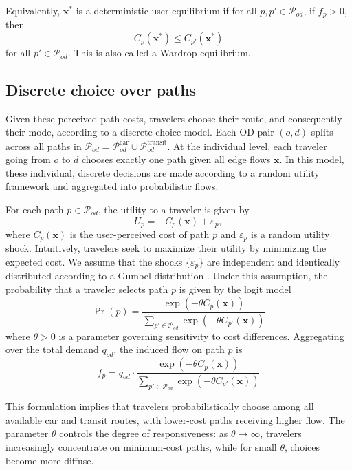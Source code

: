 \documentclass[12pt]{article}
\newcommand{\Pset}{\mathcal{P}}
\newcommand{\POD}{\Pset_{od}}
\newcommand{\PcarOD}{\Pset_{od}^\text{car}}
\newcommand{\PtransitOD}{\Pset_{od}^\text{transit}}
\renewcommand{\vec}[1]{\mathbf{#1}}
\let\epsilon\varepsilon
\begin{document}
Equivalently, $\vec{x}^\ast$ is a deterministic user equilibrium if for all $p, p' \in \POD$, if $f_p > 0$, then
\[
    C_p(\vec{x}^\ast) \leq C_{p'}(\vec{x}^\ast)
\]
for all $p' \in \POD$.
This is also called a Wardrop equilibrium.


\subsection{Discrete choice over paths}

Given these perceived path costs, travelers choose their route, and consequently their mode, according to a discrete choice model. 
Each OD pair $(o, d)$ splits across all paths in $\POD = \PcarOD \cup \PtransitOD$.
At the individual level, each traveler going from $o$ to $d$ chooses exactly one path given all edge flows $\vec{x}$. 
In this model, these individual, discrete decisions are made according to a random utility framework \citep{mcfadden1974logit} and aggregated into probabilistic flows.

For each path $p \in \POD$, the utility to a traveler is given by
\[
    U_p = -C_p(\vec{x}) + \epsilon_p,
\]
where $C_p(\vec{x})$ is the user-perceived cost of path $p$ and $\epsilon_p$ is a random utility shock.
Intuitively, travelers seek to maximize their utility by minimizing the expected cost.
We assume that the shocks $\{\epsilon_p\}$ are independent and identically distributed according to a Gumbel distribution \citep{mcfadden1974logit}.
Under this assumption, the probability that a traveler selects path $p$ is given by the logit model
\[
    \Pr{(p)} = \frac{\exp{(-\theta C_p(\vec{x}))}}{\sum_{p' \in \POD}{\exp{(-\theta C_{p'}(\vec{x}))}}}
\]
where $\theta > 0$ is a parameter governing sensitivity to cost differences.
Aggregating over the total demand $q_{od}$, the induced flow on path $p$ is
\begin{equation}
    \label{eqn:single_logit_model}
    f_p = q_{od} \cdot \frac{\exp{(-\theta C_p(\vec{x}))}}{\sum_{p' \in \POD}{\exp{(-\theta C_{p'}(\vec{x}))}}}
\end{equation}

This formulation implies that travelers probabilistically choose among all available car and transit routes, with lower-cost paths receiving higher flow.
The parameter $\theta$ controls the degree of responsiveness: as $\theta \to \infty$, travelers increasingly concentrate on minimum-cost paths, while for small $\theta$, choices become more diffuse.
\end{document}
